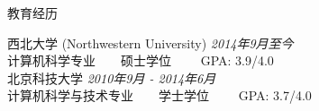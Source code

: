 \documentclass{resume} %
\begin{document}

\begin{rSection}{教育经历}

{\large 西北大学 (Northwestern University)} \hfill {\em 2014年9月至今} \\ 
计算机科学专业~~~~硕士学位~~~~
GPA: 3.9/4.0\\[0.3em]
{\large 北京科技大学} \hfill {\em 2010年9月 - 2014年6月} \\ 
计算机科学与技术专业~~~~学士学位~~~~
GPA: 3.7/4.0
\end{rSection}

\end{document}

